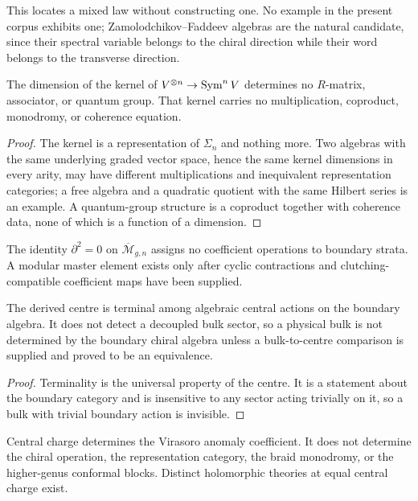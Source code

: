 This locates a mixed law without constructing one. No example in the present
corpus exhibits one; Zamolodchikov--Faddeev algebras are the natural candidate,
since their spectral variable belongs to the chiral direction while their word
belongs to the transverse direction.

\begin{theorem}
\label{nogo:dimension-loss-spine}
The dimension of the kernel of $V^{\otimes n}\to\operatorname{Sym}^nV$ determines no
$R$-matrix, associator, or quantum group. That kernel carries no
multiplication, coproduct, monodromy, or coherence equation.
\end{theorem}
\begin{proof}
The kernel is a representation of $\Sigma_n$ and nothing more. Two algebras
with the same underlying graded vector space, hence the same kernel dimensions
in every arity, may have different multiplications and inequivalent
representation categories; a free algebra and a quadratic quotient with the
same Hilbert series is an example. A quantum-group structure is a coproduct
together with coherence data, none of which is a function of a dimension.
\end{proof}

\begin{theorem}
The identity $\partial^2=0$ on $\overline{\mathcal M}_{g,n}$ assigns no
coefficient operations to boundary strata. A modular master element exists only
after cyclic contractions and clutching-compatible coefficient maps have been
supplied.
\end{theorem}

\begin{theorem}
The derived centre is terminal among algebraic central actions on the boundary
algebra. It does not detect a decoupled bulk sector, so a physical bulk is not
determined by the boundary chiral algebra unless a bulk-to-centre comparison is
supplied and proved to be an equivalence.
\end{theorem}
\begin{proof}
Terminality is the universal property of the centre. It is a statement about
the boundary category and is insensitive to any sector acting trivially on it,
so a bulk with trivial boundary action is invisible.
\end{proof}

\begin{theorem}
Central charge determines the Virasoro anomaly coefficient. It does not
determine the chiral operation, the representation category, the braid
monodromy, or the higher-genus conformal blocks. Distinct holomorphic theories
at equal central charge exist.
\end{theorem}

